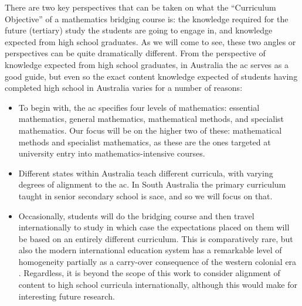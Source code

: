 \documentclass[twoside,12pt,a4paper]{report}
\begin{document}
There are two key perspectives that can be taken on what the ``Curriculum Objective'' of a mathematics bridging course is: the knowledge required for the future (tertiary) study the students are going to engage in, and knowledge expected from high school graduates. As we will come to see, these two angles or perspectives can be quite dramatically different. From the perspective of knowledge expected from high school graduates, in Australia the \gls{ac} serves as a good guide, but even so the exact content knowledge expected of students having completed high school in Australia varies for a number of reasons:
\begin{itemize}
	\item To begin with, the \gls{ac} specifies four levels of mathematics: essential mathematics, general mathematics, mathematical methods, and specialist mathematics. Our focus will be on the higher two of these: mathematical methods and specialist mathematics, as these are the ones targeted at university entry into mathematics-intensive courses. 
	\item Different states within Australia teach different curricula, with varying degrees of alignment to the \gls{ac}. In South Australia the primary curriculum taught in senior secondary school is \gls{sace}, and so we will focus on that.
	\item Occasionally, students will do the bridging course and then travel internationally to study in which case the expectations placed on them will be based on an entirely different curriculum. This is comparatively rare, but also the modern international education system has a remarkable level of homogeneity partially as a carry-over consequence of the western colonial era \cite{Mohandas2003}. Regardless, it is beyond the scope of this work to consider alignment of content to high school curricula internationally, although this would make for interesting future research.
\end{itemize}
\end{document}
